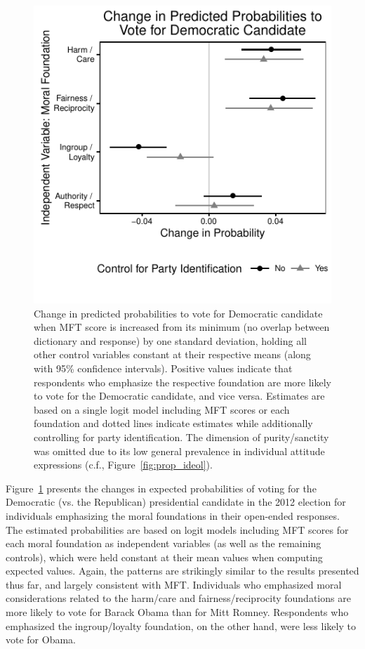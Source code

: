\documentclass[12pt]{article}
\begin{document}
\begin{figure}[ht]\centering
\includegraphics[scale=.9]{../calc/fig/logit_vote.pdf}
\caption{Change in predicted probabilities to vote for Democratic candidate when MFT score is increased from its minimum (no overlap between dictionary and response) by one standard deviation, holding all other control variables constant at their respective means (along with 95\% confidence intervals). Positive values indicate that respondents who emphasize the respective foundation are more likely to vote for the Democratic candidate, and vice versa. Estimates are based on a single logit model including MFT scores or each foundation and dotted lines indicate estimates while additionally controlling for party identification. The dimension of purity/sanctity was omitted due to its low general prevalence in individual attitude expressions (c.f., Figure~\ref{fig:prop_ideol}). %
}\label{fig:logit_vote}
\end{figure}

Figure~\ref{fig:logit_vote} presents the changes in expected probabilities of voting for the Democratic (vs. the Republican) presidential candidate in the 2012 election for individuals emphasizing the moral foundations in their open-ended responses. The estimated probabilities are based on logit models including MFT scores for each moral foundation as independent variables (as well as  the remaining controls), which were held constant at their mean values when computing expected values. Again, the patterns are strikingly similar to the results presented thus far, and largely consistent with MFT. Individuals who emphasized moral considerations related to the harm/care and fairness/reciprocity foundations are more likely to vote for Barack Obama than for Mitt Romney. Respondents who emphasized the ingroup/loyalty foundation, on the other hand, were less likely to vote for Obama. 
\end{document}
